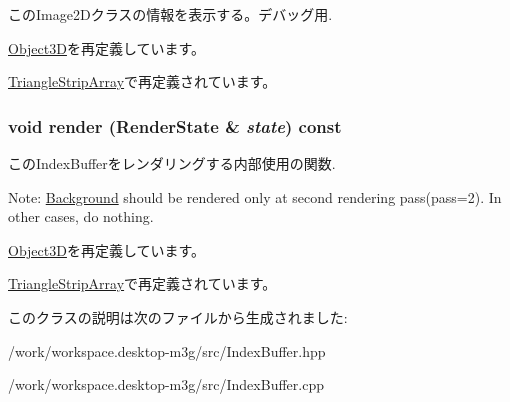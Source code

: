 このImage2Dクラスの情報を表示する。デバッグ用. 

\hyperlink{classm3g_1_1Object3D_6fea17fa1532df3794f8cb39cb4f911f}{Object3D}を再定義しています。

\hyperlink{classm3g_1_1TriangleStripArray_6fea17fa1532df3794f8cb39cb4f911f}{TriangleStripArray}で再定義されています。\hypertarget{classm3g_1_1IndexBuffer_8babc8a79b78615da51161e94029eea9}{
\subsubsection[{render}]{\setlength{\rightskip}{0pt plus 5cm}void render ({\bf RenderState} \& {\em state}) const}}
\label{classm3g_1_1IndexBuffer_8babc8a79b78615da51161e94029eea9}


このIndexBufferをレンダリングする内部使用の関数.

Note: \hyperlink{classm3g_1_1Background}{Background} should be rendered only at second rendering pass(pass=2). In other cases, do nothing. 

\hyperlink{classm3g_1_1Object3D_8babc8a79b78615da51161e94029eea9}{Object3D}を再定義しています。

\hyperlink{classm3g_1_1TriangleStripArray_8babc8a79b78615da51161e94029eea9}{TriangleStripArray}で再定義されています。

このクラスの説明は次のファイルから生成されました:\begin{CompactItemize}
\item 
/work/workspace.desktop-m3g/src/IndexBuffer.hpp\item 
/work/workspace.desktop-m3g/src/IndexBuffer.cpp\end{CompactItemize}
